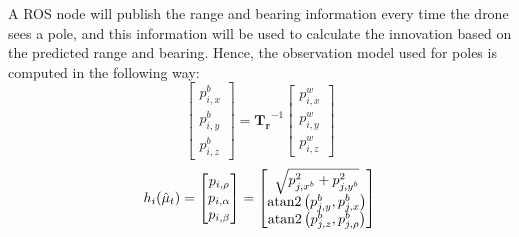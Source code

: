 A ROS node will publish the range and bearing information every time the drone sees a pole, and this information will be used to calculate the innovation based on the predicted range and bearing. Hence, the observation model used for poles is computed in the following way:
\begin{equation}
    \begin{bmatrix}
        p_{i, x}^b \\ p_{i, y}^b \\ p_{i, z}^b
    \end{bmatrix} = \bm{T_r}^{-1} \begin{bmatrix}
        p_{i, x}^w \\ p_{i, y}^w \\ p_{i, z}^w
\end{bmatrix}
\label{eq:chapter2:correction:pole:world2body_transform}
\end{equation}
\begin{equation}
    h_i(\hat\mu_t) = \begin{bmatrix}
        p_{i, \rho} \\ p_{i, \alpha} \\ p_{i, \beta}
    \end{bmatrix} = \begin{bmatrix}
    \sqrt{ p_{j, x^b}^2 + p_{j, y^b}^2 } \\
    \operatorname{atan2}\left(p_{j, y}^b, p_{j, x}^b\right) \\
    \operatorname{atan2}\left(p_{j, z}^b, p_{j,\rho}^b\right)
\end{bmatrix}
\label{eq:chapter2:correction:pole:range_bearing}
\end{equation}

